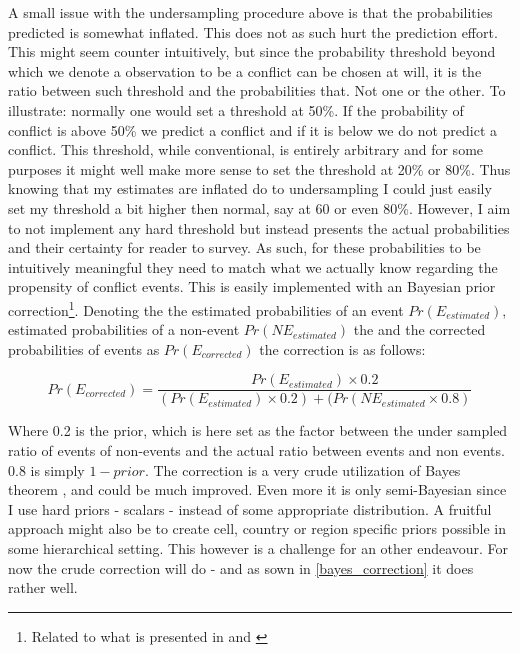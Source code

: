 \documentclass[a4paper]{article}
\begin{document}
A small issue with the undersampling procedure above is that the probabilities predicted is somewhat inflated. This does not as such hurt the prediction effort. This might seem counter intuitively, but since the probability threshold beyond which we denote a observation to be a conflict can be chosen at will, it is the ratio between such threshold and the probabilities that. Not one or the other. To illustrate: normally one would set a threshold at 50\%. If the probability of conflict is above 50\% we predict a conflict and if it is below we do not predict a conflict. This threshold, while conventional, is entirely arbitrary and for some purposes it might well make more sense to set the threshold at 20\% or 80\%. Thus knowing that my estimates are inflated do to undersampling I could just easily set my threshold a bit higher then normal, say at 60 or even 80\%. However, I aim to not implement any hard threshold but instead presents the actual probabilities and their certainty for reader to survey. As such, for these probabilities to be intuitively meaningful they need to match what we actually know regarding the propensity of conflict events. This is easily implemented with an Bayesian prior correction\footnote{Related to what is presented in \cite{King_Zeng_2001, king_zeng_2001b} and \cite{Goldstone_2010}}. Denoting the the estimated probabilities of an event $Pr(E_{estimated})$, estimated probabilities of a non-event $Pr(NE_{estimated})$ the  and the corrected probabilities of events as $Pr(E_{corrected})$ the correction is as follows:

\[
Pr(E_{corrected}) = \frac{Pr(E_{estimated}) \times 0.2}{(Pr(E_{estimated}) \times 0.2)+(Pr(NE_{estimated} \times 0.8)} \tag{1} \label{eq:bayes}
\]

Where 0.2 is the prior, which is here set as the factor between the under sampled ratio of events of non-events and the actual ratio between events and non events. 0.8 is simply $1-prior$. The correction is a very crude utilization of Bayes theorem \citep[7-8]{Gelman_2013}, and could be much improved. Even more it is only semi-Bayesian since I use hard priors - scalars - instead of some appropriate distribution. A fruitful approach might also be to create cell, country or region specific priors possible in some hierarchical setting. This however is a challenge for an other endeavour. For now the crude correction will do - and as sown in \autoref{bayes_correction} it does rather well.\par
\end{document}

